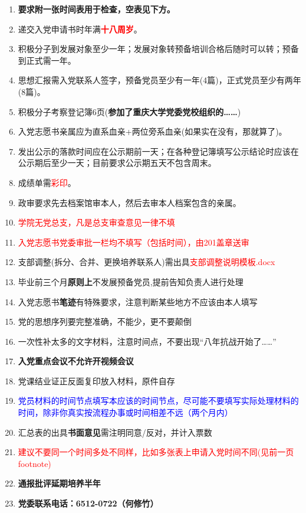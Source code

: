 \documentclass[fontset=windows]{ctexart}
\begin{document}
\begin{tcolorbox}
    \begin{enumerate}
        \item \textbf{\huge 要求附一张时间表用于检查，空表见下方。}
        \item 递交入党申请书时年满\textbf{\textcolor{red}{十八周岁}}。\label{enterdate}
        \item 积极分子到发展对象至少一年；发展对象转预备培训合格后随时可以转；预备到正式需一年。
        \item 思想汇报需入党联系人签字，预备党员至少有一年(4篇)，正式党员至少有两年(8篇)。
        \item 积极分子考察登记簿6页{\Large (\textbf{参加了重庆大学党委党校组织的……})}
        \item 入党志愿书亲属应为直系血亲+两位旁系血亲(如果实在没有，那就算了)。
        \item 发出公示的落款时间应在公示期前一天；在各种登记簿填写公示结论时应该在公示期后至少一天；目前要求公示期五天不包含周末。
        \item 成绩单需{\Large \textcolor{red}{彩印}}。
        \item 政审要求先去档案馆审本人，然后去审本人档案包含的亲属。
        \item \textcolor{red}{学院无党总支，凡是总支审查意见一律不填}
        \item \textcolor{red}{\huge 入党志愿书党委审批一栏均不填写（包括时间），由201盖章送审} \label{very important point}
        \item 支部调整(拆分、合并、更换培养联系人)需出具\textcolor{red}{支部调整说明模板.docx}
        \item 毕业前三个月\textbf{原则上}不发展预备党员,提前告知负责人进行处理
        \item 入党志愿书\textbf{笔迹}有特殊要求，注意判断某些地方不应该由本人填写\label{biji}
        \item 党的思想序列要完整准确，不能少，更不要颠倒
        \item 一次性补太多的文字材料，注意时间点，不要出现“八年抗战开始了……”
        \item \textbf{入党重点会议不允许开视频会议}
        \item 党课结业证正反面复印放入材料，原件自存
        \item \textcolor{blue}{党员材料的时间节点填写本应该的时间节点，尽可能不要填写实际处理材料的时间，除非你真实按流程办事或时间相差不远（两个月内）}
        \item 汇总表的出具\textbf{书面意见}需注明同意/反对，并计入票数
        \item \textcolor{red}{建议不要同一个时间多处不同样，比如多张表上申请入党时间不同(见前一页footnote)}
        \item \textbf{通报批评延期培养半年}
        \item \textbf{党委联系电话：6512-0722（何修竹）}
    \end{enumerate}
\end{tcolorbox}
\end{document}
